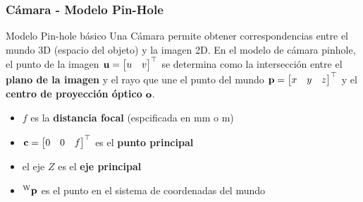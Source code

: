\begin{frame}
    \frametitle{Cámara - Modelo Pin-Hole}
    
    
    \footnotesize
    \begin{figure}[!h]
    \end{figure}
    
    \begin{block}{Modelo Pin-hole básico}
        Una Cámara permite obtener correspondencias entre el mundo 3D (espacio del objeto) y la imagen 2D. En el modelo de cámara pinhole, el punto de la imagen $\boldsymbol{\mathbf{u}}=\begin{bmatrix}u & v\end{bmatrix}^{\top}$ se determina como la intersección entre el {\bf plano de la imagen} y el rayo que une el punto del mundo $\boldsymbol{\mathbf{p}} =\begin{bmatrix}x & y & z\end{bmatrix}^{\top}$ y el {\bf centro de proyección óptico} $\boldsymbol{\mathbf{o}}$. 
    \end{block}
    
    \begin{itemize}
        \item $f$ es la \textbf{distancia focal}  (espcificada en \si{\milli\meter} o \si{\meter})
        \item $\boldsymbol{\mathbf{c}} = \begin{bmatrix}0 & 0 & f\end{bmatrix}^{\top}$ es el \textbf{punto principal}
        \item el eje $Z$ es el {\bf eje principal}
        \item $\prescript{\mathrm{\mathrm{W}}}{}{\boldsymbol{\mathbf{p}}}$ es el punto en el sistema de coordenadas del mundo
    \end{itemize}
\end{frame}

